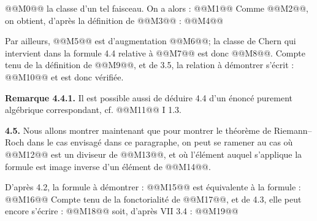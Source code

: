 
@@M0@@ la classe d'un tel faisceau. On a alors :
@@M1@@
Comme @@M2@@, on obtient, d'après la définition de @@M3@@ :
@@M4@@

Par ailleurs, @@M5@@ est d'augmentation @@M6@@; la classe de Chern qui intervient dans la formule 4.4 relative à @@M7@@ est donc @@M8@@. Compte tenu de la définition de @@M9@@, et de 3.5, la relation à démontrer s'écrit :
@@M10@@
et est donc vérifiée.

\textbf{Remarque 4.4.1.} Il est possible aussi de déduire 4.4 d'un énoncé purement algébrique correspondant, cf. @@M11@@ I 1.3.

\textbf{4.5.} Nous allons montrer maintenant que pour montrer le théorème de Riemann--Roch dans le cas envisagé dans ce paragraphe, on peut se ramener au cas où @@M12@@ est un diviseur de @@M13@@, et où l'élément auquel s'applique la formule est image inverse d'un élément de @@M14@@.

D'après 4.2, la formule à démontrer :
@@M15@@
est équivalente à la formule :
@@M16@@
Compte tenu de la fonctorialité de @@M17@@, et de 4.3, elle peut encore s'écrire :
@@M18@@
soit, d'après VII 3.4 :
@@M19@@

